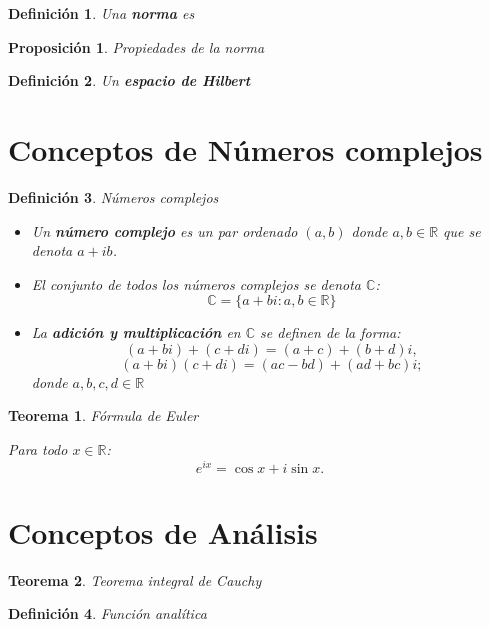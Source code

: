 \documentclass[a4paper,12pt]{article}
\newtheorem{teo}{Teorema}
\newtheorem{defi}{Definición}
\newtheorem{prop}{Proposición}
\begin{document}
\begin{defi}
    Una  {\bf norma} es 
\end{defi}

\begin{prop}
    Propiedades de la norma
\end{prop}

\begin{defi}
    Un {\bf espacio de Hilbert}
\end{defi}





\section{Conceptos de Números complejos}

\begin{defi} Números complejos

    \begin{itemize}
        \item Un {\bf número complejo} es un par ordenado $(a,b)$ donde $a,b \in \mathbb{R}$ que se denota $a+ib$.
        \item El conjunto de todos los números complejos se denota $\mathbb{C}$:
        \[ \mathbb{C} = \{a+bi : a,b\in \mathbb{R}\}\]
        \item La {\bf adición y multiplicación} en $\mathbb{C}$ se definen de la forma:
        \[(a+bi) + (c+di) = (a+c)+(b+d)i,\]
        \[(a+bi)(c+di) = (ac-bd)+(ad+bc)i;\]
        donde $a,b,c,d\in\mathbb{R}$
    \end{itemize}

\end{defi}

\begin{teo} Fórmula de Euler

    Para todo $x\in\mathbb{R}$:
    \[e^{ix} = \cos x + i \sin x.\]

\end{teo}

\section{Conceptos de Análisis}

\begin{teo}
    Teorema integral de Cauchy
\end{teo}

\begin{defi}
    Función analítica
\end{defi}
\end{document}
